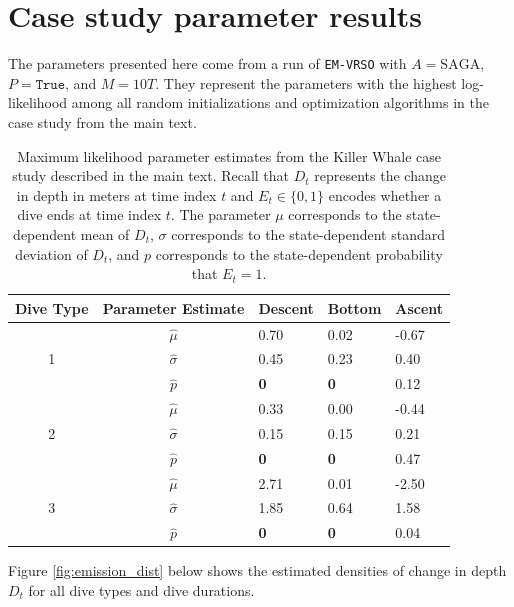 \documentclass[12pt]{article}
\begin{document}
\section{Case study parameter results}

The parameters presented here come from a run of \texttt{EM-VRSO} with $A = \text{SAGA}$, $P = \texttt{True}$, and $M=10T$. They represent the parameters with the highest log-likelihood among all random initializations and optimization algorithms in the case study from the main text. 

\begin{table}[H]
\centering
\begin{tabular}{c|c|lll}
\multicolumn{1}{l|}{Dive Type} & Parameter Estimate & Descent & Bottom & Ascent \\ \hline
\multirow{3}{*}{1}            & $\hat \mu$     & 0.70    & 0.02   & -0.67  \\
                              & $\hat \sigma$  & 0.45    & 0.23   & 0.40   \\
                              & $\hat p$       & \bf{0}  & \bf{0} & 0.12   \\ \hline 
\multirow{3}{*}{2}            & $\hat \mu$     & 0.33    & 0.00   & -0.44  \\
                              & $\hat \sigma$  & 0.15    & 0.15   & 0.21   \\
                              & $\hat p$       & \bf{0}  & \bf{0} & 0.47   \\ \hline
\multirow{3}{*}{3}            & $\hat \mu$     & 2.71    & 0.01   & -2.50  \\
                              & $\hat \sigma$  & 1.85    & 0.64   & 1.58   \\
                              & $\hat p$       & \bf{0}  & \bf{0} & 0.04  
\end{tabular}
\caption{Maximum likelihood parameter estimates from the Killer Whale case study described in the main text. Recall that $D_t$ represents the change in depth in meters at time index $t$ and $E_t \in \{0,1\}$ encodes whether a dive ends at time index $t$. The parameter $\mu$ corresponds to the state-dependent mean of $D_t$, $\sigma$ corresponds to the state-dependent standard deviation of $D_t$, and $p$ corresponds to the state-dependent probability that $E_t=1$.}
\end{table}

Figure \ref{fig:emission_dist} below shows the estimated densities of change in depth $D_t$ for all dive types and dive durations.
\end{document}
